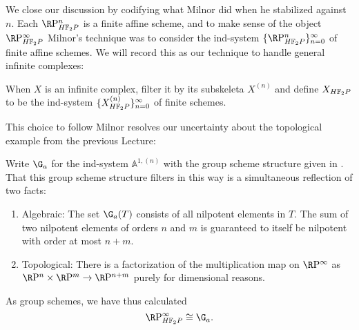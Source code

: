 We close our discussion by codifying what Milnor did when he stabilized against \(n\).  Each \(\RP^n_{\HFtwo P}\) is a finite affine scheme, and to make sense of the object \(\RP^\infty_{\HFtwo P}\) Milnor's technique was to consider the ind-system \(\{\RP^n_{\HFtwo P}\}_{n=0}^\infty\) of finite affine schemes.  We will record this as our technique to handle general infinite complexes:
\begin{definition}\label{FullDefnOfXHF2}
When \(X\) is an infinite complex, filter it by its subskeleta \(X^{(n)}\) and define \(X_{\HFtwo P}\) to be the ind-system \(\{X^{(n)}_{\HFtwo P}\}_{n=0}^\infty\) of finite schemes.
\end{definition}

This choice to follow Milnor resolves our uncertainty about the topological example from the previous Lecture:
\begin{example}\label{RPinftyExampleForReal}
Write \(\G_a\) for the ind-system \(\mathbb A^{1, (n)}\) with the group scheme structure given in .  That this group scheme structure filters in this way is a simultaneous reflection of two facts:
\begin{enumerate}
\item Algebraic: The set \(\G_a(T)\) consists of all nilpotent elements in \(T\).  The sum of two nilpotent elements of orders \(n\) and \(m\) is guaranteed to itself be nilpotent with order at most \(n+m\).
\item Topological: There is a factorization of the multiplication map on \(\RP^\infty\) as \(\RP^n \times \RP^m \to \RP^{n+m}\) purely for dimensional reasons.
\end{enumerate}
As group schemes, we have thus calculated \[\RP^\infty_{\HFtwo P} \cong \G_a.\]
\end{example}

